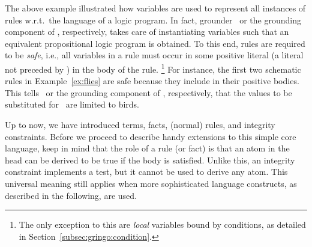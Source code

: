 The above example illustrated how variables are used to represent all instances of
rules w.r.t.\ the language of a logic program.
In fact, grounder \gringo\ or the grounding component of \clingo, respectively,
takes care of instantiating variables
such that an equivalent propositional logic program is obtained.
To this end,
rules are required to be \emph{safe}, 
\label{pg:safe}%
%
i.e.,
all variables in a rule must occur in some positive literal
(a literal not preceded by ) in the body of the rule.%
\footnote{%
The only exception to this are \emph{local} variables bound by conditions,
as detailed in Section~\ref{subsec:gringo:condition}.} 
For instance, the first two schematic rules in Example~\ref{ex:flies} 
are safe because they include  in their positive bodies.
This tells \gringo\ or the grounding component of \clingo, respectively,
that the values to be substituted for~ are limited to birds.


Up to now, we have introduced terms, facts, (normal) rules, and integrity constraints.
Before we proceed to describe handy extensions to this simple core language,
keep in mind that the role of a rule (or fact) is that an atom in the
head can be derived to be true if the body is satisfied.
Unlike this, an integrity constraint implements a test,
but it cannot be used to derive any atom.
This universal meaning still applies when more sophisticated language constructs,
as described in the following, are used.


